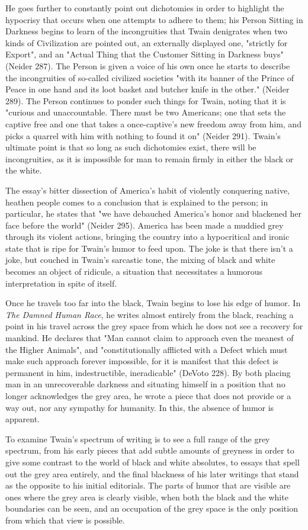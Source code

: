 He goes further to constantly point out dichotomies in order to highlight the
hypocrisy that occurs when one attempts to adhere to them; his Person Sitting in
Darkness begins to learn of the incongruities that Twain denigrates when two
kinds of Civilization are pointed out, an externally displayed one, "strictly
for Export", and an "Actual Thing that the Customer Sitting in Darkness buys"
(Neider 287). The Person is given a voice of his own once he starts to describe
the incongruities of so-called civilized societies "with its banner of the
Prince of Peace in one hand and its loot basket and butcher knife in the other."
(Neider 289).  The Person continues to ponder such things for Twain, noting that
it is "curious and unaccountable. There must be two Americans; one that sets the
captive free and one that takes a once-captive's new freedom away from him, and
picks a quarrel with him with nothing to found it on" (Neider 291). Twain's
ultimate point is that so long as such dichotomies exist, there will be
incongruities, as it is impossible for man to remain firmly in either the black
or the white.

The essay's bitter dissection of America's habit of violently conquering native,
heathen people comes to a conclusion that is explained to the person; in
particular, he states that "we have debauched America's honor and blackened her
face before the world" (Neider 295). America has been made a muddied grey
through its violent actions, bringing the country into a hypocritical and ironic
state that is ripe for Twain's humor to feed upon. The joke is that there isn't
a joke, but couched in Twain's sarcastic tone, the mixing of black and white
becomes an object of ridicule, a situation that necessitates a humorous
interpretation in spite of itself.

Once he travels too far into the black, Twain begins to lose his edge of humor.
In \textit{The Damned Human Race}, he writes almost entirely from the black,
reaching a point in his travel across the grey space from which he does not see
a recovery for mankind. He declares that "Man cannot claim to approach even the
meanest of the Higher Animals", and "constitutionally afflicted with a Defect
which must make such approach forever impossible, for it is manifest that this
defect is permanent in him, indestructible, ineradicable" (DeVoto 228). By both
placing man in an unrecoverable darkness and situating himself in a position
that no longer acknowledges the grey area, he wrote a piece that does not
provide or a way out, nor any sympathy for humanity. In this, the absence of
humor is apparent.

To examine Twain's spectrum of writing is to see a full range of the grey
spectrum, from his early pieces that add subtle amounts of greyness in order to
give some contrast to the world of black and white absolutes, to essays that
spell out the grey area entirely, and the final blackness of his later writings
that stand as the opposite to his initial editorials. The parts of humor that
are visible are ones where the grey area is clearly visible, when both the black
and the white boundaries can be seen, and an occupation of the grey space is the
only position from which that view is possible.
